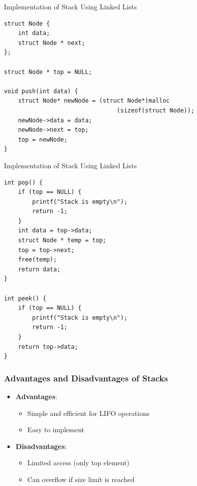 \documentclass[10pt]{beamer}
\begin{document}
\begin{frame}[fragile]{Implementation of Stack Using Linked Lists}
\begin{lstlisting}
struct Node {
    int data;
    struct Node * next;
};

struct Node * top = NULL;

void push(int data) {
    struct Node* newNode = (struct Node*)malloc
                                (sizeof(struct Node));
    newNode->data = data;
    newNode->next = top;
    top = newNode;
}
\end{lstlisting}
\end{frame}

\begin{frame}[fragile]{Implementation of Stack Using Linked Lists}
\begin{lstlisting}    
int pop() {
    if (top == NULL) {
        printf("Stack is empty\n");
        return -1;
    }
    int data = top->data;
    struct Node * temp = top;
    top = top->next;
    free(temp);
    return data;
}

int peek() {
    if (top == NULL) {
        printf("Stack is empty\n");
        return -1;
    }
    return top->data;
}
\end{lstlisting}
\end{frame}

\begin{frame}\frametitle{Advantages and Disadvantages of Stacks}
    \begin{itemize}
        \item \textbf{Advantages}:
        \begin{itemize}
            \item Simple and efficient for LIFO operations
            \item Easy to implement
        \end{itemize}
        \item \textbf{Disadvantages}:
        \begin{itemize}
            \item Limited access (only top element)
            \item Can overflow if size limit is reached
        \end{itemize}
    \end{itemize}
\end{frame}
\end{document}
